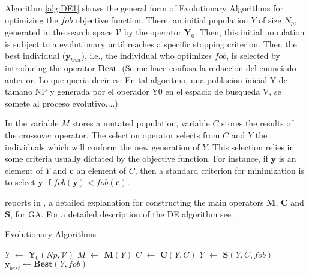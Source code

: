   Algorithm \ref{alg:DE1} shows the general form of Evolutionary Algorithms for 
optimizing the $fob$ objective function. There, an initial population $Y$ of 
size $N_p$, generated in the search space $\mathcal{V}$ by the operator 
$\mathbf{Y}_0$. Then, this initial population is subject to a evolutionary 
until reaches a specific stopping criterion. Then the best individual 
($\mathbf{y}_{best}$), i.e., the individual who optimizes $fob$, is selected by 
introducing the operator $\mathbf{Best}$. 
{\color{red} (Se me hace confusa la redaccion del enunciado anterior. Lo que queria decir es:
En tal algoritmo, una poblacion inicial Y de tamano NP y generada por el operador Y0 en el espacio de busqueda V, se somete al proceso evolutivo....)}


In  the variable $M$ stores a mutated population, 
variable $C$ stores the results of the crossover operator. The selection
operator selects from $C$ and $Y$ the individuals which will conform the new
generation of $Y$. This selection relies in some criteria 
usually dictated by the objective function. For instance, if $\mathbf{y}$ is an 
element of $Y$ and $\mathbf{c}$ an element of $C$, then a standard criterion 
for minimization is to select  $\mathbf{y}$ if 
$fob(\mathbf{y})<fob(\mathbf{c})$.

\citeauthor{Bagchi1999} reports in \cite{Bagchi1999}, a detailed explanation 
for constructing the main operators $\mathbf{M}$, $\mathbf{C}$ and 
$\mathbf{S}$, for GA. For a detailed description of the DE algorithm see 
\cite{Price_Storn2005}.
%
\begin{algorithm}[htb]
  \caption{Evolutionary Algorithms}
  \label{alg:DE1}
  \begin{algorithmic}
    \State $Y$ $\leftarrow$ $\mathbf{Y}_0(Np,\mathcal{V})$
    \State $M$ $\leftarrow$  $\mathbf{M}(Y)$
    \State $C$ $\leftarrow$  $\mathbf{C}(Y,C)$
    \State $Y$ $\leftarrow$  $\mathbf{S}(Y,C,fob)$ 
    \EndWhile
    \State $\mathbf{y}_{best} \leftarrow \mathbf{Best}(Y, fob)$
  \end{algorithmic}
\end{algorithm}%

